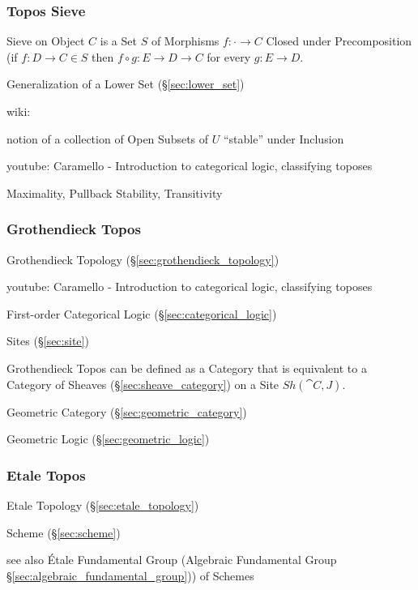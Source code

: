 \subsubsection{Topos Sieve}\label{sec:topos_sieve}

Sieve on Object $C$ is a Set $S$ of Morphisms $f : \cdot \rightarrow
C$ Closed under Precomposition (if $f : D \rightarrow C \in S$ then $f
\circ g : E \rightarrow D \rightarrow C$ for every $g : E \rightarrow
D$.

Generalization of a Lower Set (\S\ref{sec:lower_set})

wiki:

notion of a collection of Open Subsets of $U$ ``stable'' under
Inclusion %

youtube: Caramello - Introduction to categorical logic, classifying
toposes

Maximality, Pullback Stability, Transitivity %



\subsubsection{Grothendieck Topos}\label{sec:grothendieck_topos}

Grothendieck Topology (\S\ref{sec:grothendieck_topology})

youtube: Caramello - Introduction to categorical logic, classifying
toposes

First-order Categorical Logic (\S\ref{sec:categorical_logic})

Sites (\S\ref{sec:site})

Grothendieck Topos can be defined as a Category that is equivalent to
a Category of Sheaves (\S\ref{sec:sheave_category}) on a Site
$Sh(\cat{C},J)$.

Geometric Category (\S\ref{sec:geometric_category})

Geometric Logic (\S\ref{sec:geometric_logic})



\subsubsection{Etale Topos}\label{sec:etale_topos}

Etale Topology (\S\ref{sec:etale_topology})

Scheme (\S\ref{sec:scheme})

see also \'Etale Fundamental Group (Algebraic Fundamental Group
\S\ref{sec:algebraic_fundamental_group})) of Schemes



